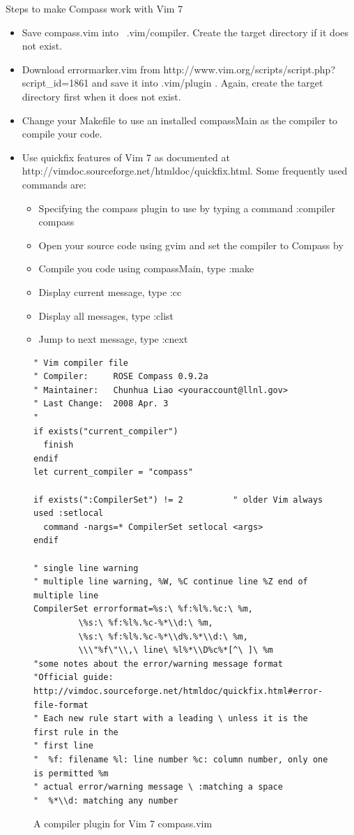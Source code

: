 Steps to make Compass work with Vim 7
\begin{itemize}
\item Save compass.vim into ~.vim/compiler.  Create the target directory if it
does not exist.
\item Download errormarker.vim from
http://www.vim.org/scripts/script.php?script\_id=1861 and save it
into .vim/plugin . Again, create the target directory first when it does not
exist.
\item Change your Makefile to use an installed compassMain as the compiler
to compile your code.
\item Use quickfix features of Vim 7 as documented at
http://vimdoc.sourceforge.net/htmldoc/quickfix.html. Some frequently used
commands are:
  \begin{itemize}
   \item Specifying the compass plugin to use by typing a command :compiler compass
   \item Open your source code using gvim and set the compiler to Compass by
   \item Compile you code using compassMain, type :make
   \item Display current message, type :cc
   \item Display all messages, type :clist
   \item Jump to next message, type :cnext
  \end{itemize}
\end{itemize}
\begin{figure}[!htp]
{\scriptsize
\begin{verbatim}
" Vim compiler file
" Compiler:     ROSE Compass 0.9.2a
" Maintainer:   Chunhua Liao <youraccount@llnl.gov>
" Last Change:  2008 Apr. 3
"
if exists("current_compiler")
  finish
endif
let current_compiler = "compass"

if exists(":CompilerSet") != 2          " older Vim always used :setlocal
  command -nargs=* CompilerSet setlocal <args>
endif

" single line warning
" multiple line warning, %W, %C continue line %Z end of multiple line
CompilerSet errorformat=%s:\ %f:%l%.%c:\ %m,
         \%s:\ %f:%l%.%c-%*\\d:\ %m,
         \%s:\ %f:%l%.%c-%*\\d%.%*\\d:\ %m,
         \\\"%f\"\\,\ line\ %l%*\\D%c%*[^\ ]\ %m
"some notes about the error/warning message format
"Official guide: http://vimdoc.sourceforge.net/htmldoc/quickfix.html#error-file-format
" Each new rule start with a leading \ unless it is the first rule in the
" first line
"  %f: filename %l: line number %c: column number, only one is permitted %m
" actual error/warning message \ :matching a space
"  %*\\d: matching any number

\end{verbatim}
}
\caption{A compiler plugin for Vim 7 compass.vim}
\label{compassVim7}
\end{figure}
